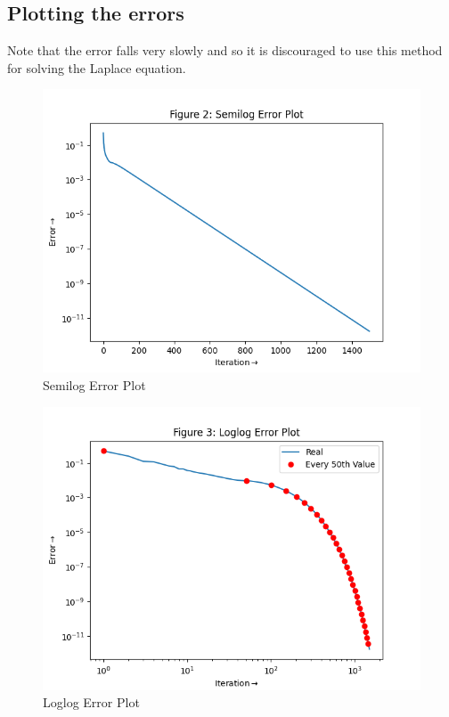 \documentclass{article}
\begin{document}
\subsection{Plotting the errors}
Note that the error falls very slowly and so it is discouraged to use this method for solving the Laplace equation.
\begin{figure}[h!]
\centering
\includegraphics[scale=0.62]{2}
\caption{Semilog Error Plot}
\label{fig:Semilog Error Plot}
\end{figure}
\begin{figure}[h!]
\centering
\includegraphics[scale=0.6]{3}
\caption{Loglog Error Plot}
\label{fig:loglog plot of error}
\end{figure}
\end{document}
